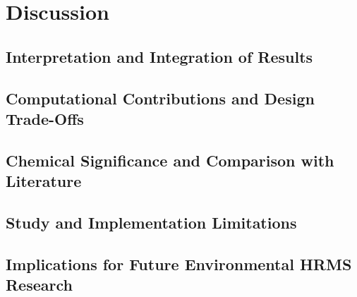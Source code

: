 
\chapter{Discussion}\label{ch:discussion}

    \section{Interpretation and Integration of Results}\label{sec:results-integration}

    \section{Computational Contributions and Design Trade-Offs}\label{sec:computational-contributions}

    \section{Chemical Significance and Comparison with Literature}\label{sec:chemical-significance}

    \section{Study and Implementation Limitations}\label{sec:limitations}

    \section{Implications for Future Environmental HRMS Research}\label{sec:future-implications}
